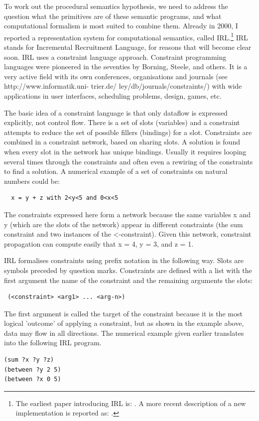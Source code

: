 To work out the procedural semantics hypothesis, we need to address the question what the primitives are of 
these semantic programs, and what computational formalism is most suited to combine them. Already in 2000, I reported
a representation system for computational semantics, called IRL.\footnote{
The earliest paper introducing IRL is: \cite{Steels:2000}. 
A more recent description of a new implementation is reported as: \cite{Spranger:2012}.}
IRL stands for Incremental Recruitment Language, for reasons that will become clear soon. 
IRL uses a constraint language approach. Constraint programming languages were pioneered in the  
seventies by Borning, Steele, and others. It is a very active field with its own conferences, 
organisations and journals (see http://www.informatik.uni- trier.de/ ley/db/journals/constraints/) 
with wide applications in user interfaces, scheduling problems, design, games, etc. 

The basic idea of a constraint language is that only dataflow is expressed explicitly, not control flow. 
There is a set of slots (variables) and a constraint attempts to reduce the set of possible 
fillers (bindings) for a slot. Constraints are combined in 
a constraint network, based on sharing slots. A solution is found when every slot in the network has unique bindings. 
Usually it requires looping several times through the constraints and often even a rewiring of the constraints to 
find a solution. A numerical example of a set of constraints on natural numbers could be:
\begin{verbatim}
  x = y + z with 2<y<5 and 0<x<5
\end{verbatim}
The constraints expressed here form a network because the same variables x and y (which are the slots of the 
network) appear in different constraints (the sum constraint and two instances of the <-constraint). 
Given this network, constraint propagation can compute easily that x = 4, y = 3, and z = 1. 

\enlargethispage{2\baselineskip}
IRL formalises constraints using prefix notation in the following way. Slots are symbols preceded 
by question marks. Constraints are defined with a list with the first argument the name of the constraint and 
the remaining arguments the slots: 
\begin{verbatim}
 (<constraint> <arg1> ... <arg-n>)
\end{verbatim}
The first argument is called the target of the constraint because it is the most logical 'outcome' 
of applying a constraint, but as shown in the example above, data may flow in all directions. The numerical 
example given earlier translates into the following IRL program. 
\begin{verbatim}
(sum ?x ?y ?z)
(between ?y 2 5)
(between ?x 0 5)
\end{verbatim}

